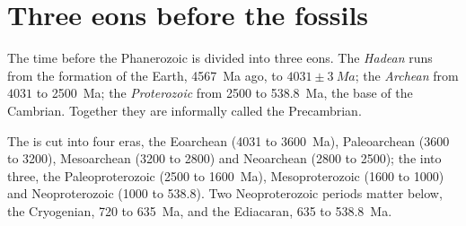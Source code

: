 \section{Three eons before the fossils}\label{sec:b2:precambrian-earth:eons}

\begin{definition}\label{def:b2:precambrian-earth:eons}
The time before the Phanerozoic is divided into three eons. The \emph{Hadean}
runs from the formation of the Earth, \qty{4567}{Ma} ago, to $4031 \pm \qty{3}{Ma}$; the
\emph{Archean} from $4031$ to \qty{2500}{Ma}; the
\emph{Proterozoic} from 2500 to \qty{538.8}{Ma}, the base of the Cambrian.
Together they are informally called the Precambrian.
\end{definition}

The  is cut into four eras, the Eoarchean (4031 to \qty{3600}{Ma}), Paleoarchean (3600
to 3200), Mesoarchean (3200 to 2800) and Neoarchean (2800 to 2500); the  into three,
the Paleoproterozoic (2500 to \qty{1600}{Ma}), Mesoproterozoic (1600 to 1000) and
Neoproterozoic (1000 to 538.8). Two Neoproterozoic periods matter below, the Cryogenian, 720 to
\qty{635}{Ma}, and the Ediacaran, 635 to \qty{538.8}{Ma}.

